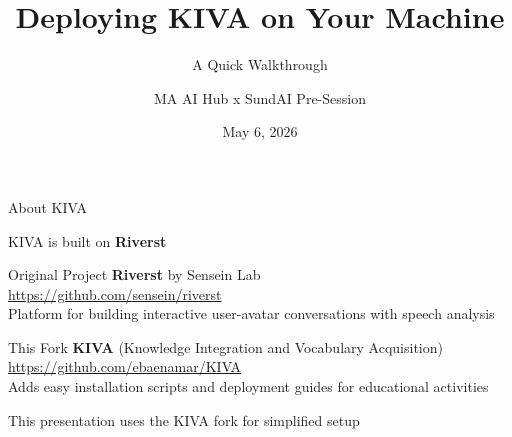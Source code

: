 \documentclass[aspectratio=169]{beamer}
\title[KIVA Deploy]{Deploying KIVA on Your Machine}
\subtitle{A Quick Walkthrough}
\author{MA AI Hub x SundAI Pre-Session}
\date{May 6, 2026}
\begin{document}
\begin{frame}
\titlepage
\end{frame}

\begin{frame}{About KIVA}
\begin{center}
\Large KIVA is built on \textbf{Riverst}
\end{center}

\vspace{0.5cm}

\begin{block}{Original Project}
\textbf{Riverst} by Sensein Lab\\
\small
\url{https://github.com/sensein/riverst}\\[0.2cm]
Platform for building interactive user-avatar conversations with speech analysis
\end{block}

\vspace{0.3cm}

\begin{block}{This Fork}
\textbf{KIVA} (Knowledge Integration and Vocabulary Acquisition)\\
\small
\url{https://github.com/ebaenamar/KIVA}\\[0.2cm]
Adds easy installation scripts and deployment guides for educational activities
\end{block}

\vspace{0.3cm}

\begin{center}
\textcolor{kivagray}{\small This presentation uses the KIVA fork for simplified setup}
\end{center}
\end{frame}
\end{document}
